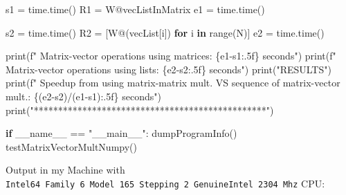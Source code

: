 \documentclass[
]{article}
\newenvironment{Shaded}{}{}
\newcommand{\BuiltInTok}[1]{#1}
\newcommand{\ControlFlowTok}[1]{\textcolor[rgb]{0.00,0.44,0.13}{\textbf{#1}}}
\newcommand{\KeywordTok}[1]{\textcolor[rgb]{0.00,0.44,0.13}{\textbf{#1}}}
\newcommand{\NormalTok}[1]{#1}
\newcommand{\OperatorTok}[1]{\textcolor[rgb]{0.40,0.40,0.40}{#1}}
\newcommand{\SpecialCharTok}[1]{\textcolor[rgb]{0.25,0.44,0.63}{#1}}
\newcommand{\SpecialStringTok}[1]{\textcolor[rgb]{0.73,0.40,0.53}{#1}}
\newcommand{\StringTok}[1]{\textcolor[rgb]{0.25,0.44,0.63}{#1}}
\newcommand{\VariableTok}[1]{\textcolor[rgb]{0.10,0.09,0.49}{#1}}
\begin{document}
\begin{Shaded}
\begin{Highlighting}[]
\NormalTok{    s1 }\OperatorTok{=}\NormalTok{ time.time()}
\NormalTok{    R1 }\OperatorTok{=}\NormalTok{ W}\OperatorTok{@}\NormalTok{vecListInMatrix}
\NormalTok{    e1 }\OperatorTok{=}\NormalTok{ time.time()}

\NormalTok{    s2 }\OperatorTok{=}\NormalTok{ time.time()}
\NormalTok{    R2 }\OperatorTok{=}\NormalTok{ [W}\OperatorTok{@}\NormalTok{(vecList[i]) }\ControlFlowTok{for}\NormalTok{ i }\KeywordTok{in} \BuiltInTok{range}\NormalTok{(N)]}
\NormalTok{    e2 }\OperatorTok{=}\NormalTok{ time.time()}

    \BuiltInTok{print}\NormalTok{(}\SpecialStringTok{f" Matrix{-}vector operations using matrices: }\SpecialCharTok{\{}\NormalTok{e1}\OperatorTok{{-}}\NormalTok{s1}\SpecialCharTok{:.5f\}}\SpecialStringTok{ seconds"}\NormalTok{)}
    \BuiltInTok{print}\NormalTok{(}\SpecialStringTok{f" Matrix{-}vector operations using lists: }\SpecialCharTok{\{}\NormalTok{e2}\OperatorTok{{-}}\NormalTok{s2}\SpecialCharTok{:.5f\}}\SpecialStringTok{ seconds"}\NormalTok{)}
    \BuiltInTok{print}\NormalTok{(}\StringTok{"RESULTS"}\NormalTok{)}
    \BuiltInTok{print}\NormalTok{(}\SpecialStringTok{f" Speedup from using matrix{-}matrix mult. VS sequence of matrix{-}vector mult.: }\SpecialCharTok{\{}\NormalTok{(e2}\OperatorTok{{-}}\NormalTok{s2)}\OperatorTok{/}\NormalTok{(e1}\OperatorTok{{-}}\NormalTok{s1)}\SpecialCharTok{:.5f\}}\SpecialStringTok{ seconds"}\NormalTok{)}
    \BuiltInTok{print}\NormalTok{(}\StringTok{"************************************************"}\NormalTok{)}

\ControlFlowTok{if} \VariableTok{\_\_name\_\_} \OperatorTok{==} \StringTok{"\_\_main\_\_"}\NormalTok{:}
\NormalTok{    dumpProgramInfo()}
\NormalTok{    testMatrixVectorMultNumpy()}
\end{Highlighting}
\end{Shaded}

Output in my Machine with \\
\texttt{Intel64\ Family\ 6\ Model\ 165\ Stepping\ 2\ GenuineIntel\ 2304\ Mhz}
CPU:
\end{document}
